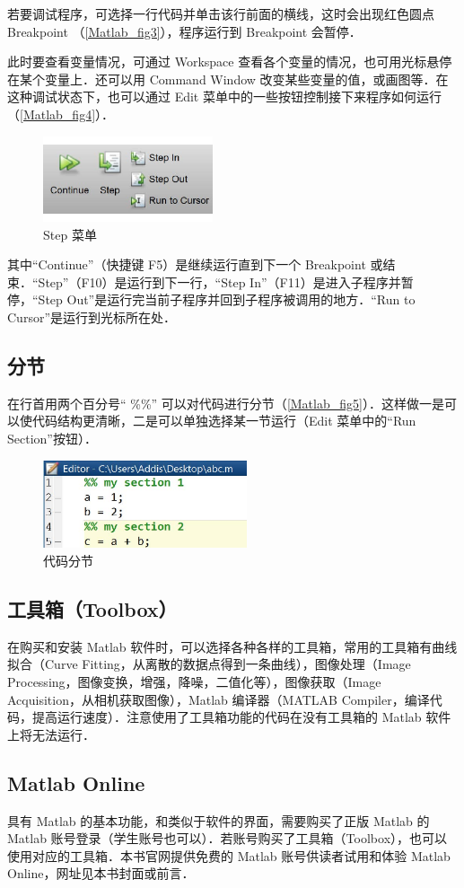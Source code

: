 若要调试程序，可选择一行代码并单击该行前面的横线，这时会出现红色圆点 Breakpoint （\autoref{Matlab_fig3}），程序运行到 Breakpoint 会暂停．

此时要查看变量情况，可通过 Workspace 查看各个变量的情况，也可用光标悬停在某个变量上．还可以用 Command Window 改变某些变量的值，或画图等．在这种调试状态下，也可以通过 Edit 菜单中的一些按钮控制接下来程序如何运行（\autoref{Matlab_fig4}）．
\begin{figure}[ht]
\centering
\includegraphics[width= 5cm]{./figures/Matlab4.pdf}
\caption{Step 菜单}\label{Matlab_fig4}
\end{figure}
其中“Continue”（快捷键 F5）是继续运行直到下一个 Breakpoint 或结束．“Step”（F10）是运行到下一行，“Step In”（F11）是进入子程序并暂停，“Step Out”是运行完当前子程序并回到子程序被调用的地方．“Run to Cursor”是运行到光标所在处．

\subsection{分节}
在行首用两个百分号“ \%\%” 可以对代码进行分节（\autoref{Matlab_fig5}）．这样做一是可以使代码结构更清晰，二是可以单独选择某一节运行（Edit 菜单中的“Run Section”按钮）．
\begin{figure}[ht]
\centering
\includegraphics[width= 6cm]{./figures/Matlab5.pdf}
\caption{代码分节}\label{Matlab_fig5}
\end{figure}

\subsection{工具箱（Toolbox）}
在购买和安装 Matlab 软件时，可以选择各种各样的工具箱，常用的工具箱有曲线拟合（Curve Fitting，从离散的数据点得到一条曲线），图像处理（Image Processing，图像变换，增强，降噪，二值化等），图像获取（Image Acquisition，从相机获取图像），Matlab 编译器（MATLAB Compiler，编译代码，提高运行速度）．注意使用了工具箱功能的代码在没有工具箱的 Matlab 软件上将无法运行．

\subsection{Matlab Online}
具有 Matlab 的基本功能，和类似于软件的界面，需要购买了正版 Matlab 的 Matlab 账号登录（学生账号也可以）．若账号购买了工具箱（Toolbox），也可以使用对应的工具箱．本书官网提供免费的 Matlab 账号供读者试用和体验 Matlab Online，网址见本书封面或前言．



